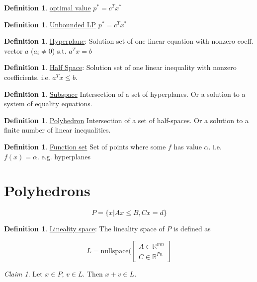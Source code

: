 \documentclass[psamsfonts, 12pt]{amsart}
\theoremstyle{definition}
\newtheorem{defn}[thm]{Definition}
\theoremstyle{remark}
\newtheorem*{claim}{Claim}
\newcommand{\R}{\mathbb{R}}
\begin{document}
\begin{defn}
\underline{optimal value} $p^* = c^Tx^*$
\end{defn}

\begin{defn}
\underline{Unbounded LP} $p^* = c^Tx^*$
\end{defn}

\begin{defn}
\underline{Hyperplane}: Solution set of one linear equation with nonzero coeff. vector $a$ ($a_i\neq 0$) s.t. $a^Tx = b$
\end{defn}

\begin{defn}
\underline{Half Space}: Solution set of one linear inequality with nonzero coefficients. i.e. $a^Tx \leq b$.
\end{defn}

\begin{defn}
\underline{Subspace} Intersection of a set of hyperplanes. Or a solution to a system of equality equations.
\end{defn}

\begin{defn}
\underline{Polyhedron} Intersection of a set of half-spaces. Or a solution to a finite number of linear inequalities.
\end{defn}

\begin{defn}
\underline{Function set} Set of points where some $f$ has value $\alpha$. i.e. $f(x) = \alpha$. e.g. hyperplanes
\end{defn}

\section{Polyhedrons}

\[
    P = \{ x | Ax\leq B, Cx = d\}
\]

\begin{defn}
    \underline{Lineality space}: The lineality space of $P$ is defined as 
    
    \[
        L = \text{nullspace}( \begin{bmatrix}
        A \in \R^{mn}\\
        C \in \R^{Pn}
        \end{bmatrix}
    \]
\end{defn}

\begin{claim}
Let $x\in P$, $v\in L$. Then $x + v \in L$.
\end{claim}
\end{document}

